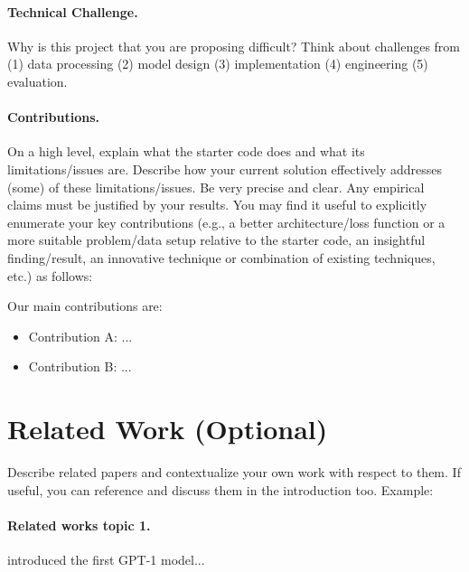 \documentclass{article}
\begin{document}
\paragraph{Technical Challenge.}
Why is this project that you are proposing difficult? Think about challenges from (1) data processing (2) model design (3) implementation (4) engineering (5) evaluation.


\paragraph{Contributions.}
 On a high level, explain what the starter code does and what its limitations/issues are. Describe how your current solution effectively addresses (some) of these limitations/issues. Be very precise and clear. Any empirical claims must be justified by your results. You may find it useful to explicitly enumerate your key contributions (e.g., a better architecture/loss function or a more suitable problem/data setup relative to the starter code, an insightful finding/result, an innovative technique or combination of existing techniques, etc.) as follows:



Our main contributions are:
\begin{itemize}
  \item Contribution A: ...
  \item Contribution B: ...
\end{itemize}

\section{Related Work (Optional)}
\label{sec:relatedwork}
Describe related papers and contextualize your own work with respect to them. If useful, you can reference and discuss them in the introduction too. Example:
\paragraph{Related works topic 1.} \citet{radford2018improving} introduced the first GPT-1 model...  %
\end{document}

